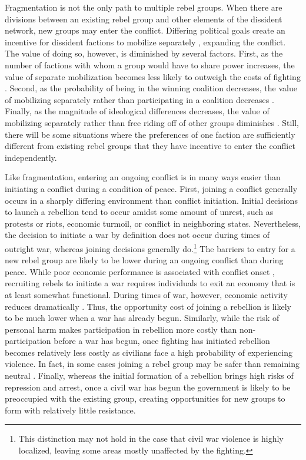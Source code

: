 Fragmentation is not the only path to multiple rebel groups. When there are divisions between an existing rebel group and other elements of the dissident network, new groups may enter the conflict. Differing political goals create an incentive for dissident factions to mobilize separately \citep{Wolford}, expanding the conflict. The value of doing so, however, is diminished by several factors. First, as the number of factions with whom a group would have to share power increases, the value of separate mobilization becomes less likely to outweigh the costs of fighting \citep{Christia2012,Wolford}. Second, as the probability of being in the winning coalition decreases, the value of mobilizing separately rather than participating in a coalition decreases \citep{Christia2012}. Finally, as the magnitude of ideological differences decreases, the value of mobilizing separately rather than free riding off of other groups diminishes \citep{Lichbach1995,Metternich2013}. Still, there will be some situations where the preferences of one faction are sufficiently different from existing rebel groups that they have incentive to enter the conflict independently.

Like fragmentation, entering an ongoing conflict is in many ways easier than initiating a conflict during a condition of peace. First, joining a conflict generally occurs in a sharply differing environment than conflict initiation. Initial decisions to launch a rebellion tend to occur amidst some amount of unrest, such as protests or riots, economic turmoil, or conflict in neighboring states. Nevertheless, the decision to initiate a war by definition does not occur during times of outright war, whereas joining decisions generally do.\footnote{This distinction may not hold in the case that civil war violence is highly localized, leaving some areas mostly unaffected by the fighting.} The barriers to entry for a new rebel group are likely to be lower during an ongoing conflict than during peace. While poor economic performance is associated with conflict onset \citep{Collier2004}, recruiting rebels to initiate a war requires individuals to exit an economy that is at least somewhat functional. During times of war, however, economic activity reduces dramatically \citep{collier99}. Thus, the opportunity cost of joining a rebellion is likely to be much lower when a war has already begun. Similarly, while the risk of personal harm makes participation in rebellion more costly than non-participation before a war has begun, once fighting has initiated rebellion becomes relatively less costly as civilians face a high probability of experiencing violence. In fact, in some cases joining a rebel group may be safer than remaining neutral \citep{Kalyvas2014}. Finally, whereas the initial formation of a rebellion brings high risks of repression and arrest, once a civil war has begun the government is likely to be preoccupied with the existing group, creating opportunities for new groups to form with relatively little resistance.

